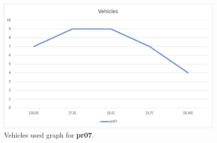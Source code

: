 \begin{figure}[H]
    \centering
    \includegraphics[height=0.25\textheight]{../graphs/pr07-vehicles.png}
    \caption{Vehicles used graph for \textbf{pr07}.}
\end{figure}

\newpage